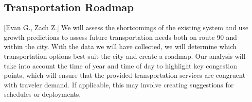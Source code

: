 \documentclass[12pt]{article}                         %
\begin{document}
\subsection{Transportation Roadmap}[Evan G., Zach Z.]
We will assess the shortcomings of the existing system and use growth predictions to assess future transportation needs both on route 90 and within the city. With the data we will have collected, we will determine which transportation options best suit the city and create a roadmap. Our analysis will take into account the time of year and time of day to highlight key congestion points, which will ensure that the provided transportation services are congruent with traveler demand. If applicable, this may involve creating suggestions for schedules or deployments. 


\newpage


\end{document}
